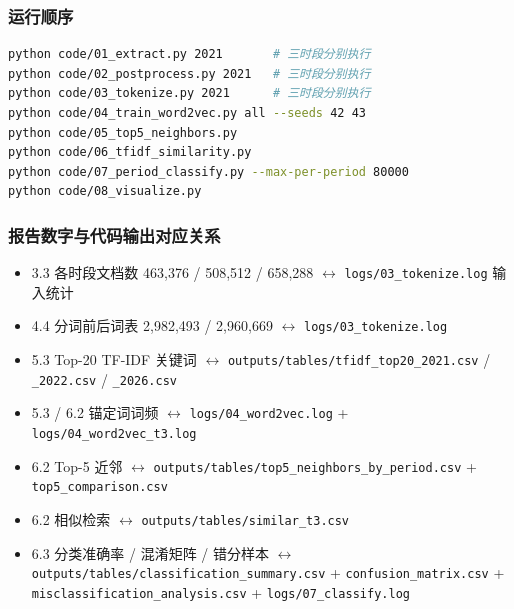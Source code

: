 \documentclass[12pt,a4paper]{article}
\begin{document}
\subsubsection*{运行顺序}

\begin{lstlisting}[language=bash, basicstyle=\ttfamily\footnotesize]
python code/01_extract.py 2021       # 三时段分别执行
python code/02_postprocess.py 2021   # 三时段分别执行
python code/03_tokenize.py 2021      # 三时段分别执行
python code/04_train_word2vec.py all --seeds 42 43
python code/05_top5_neighbors.py
python code/06_tfidf_similarity.py
python code/07_period_classify.py --max-per-period 80000
python code/08_visualize.py
\end{lstlisting}

\subsubsection*{报告数字与代码输出对应关系}

\begin{itemize}[leftmargin=2em,itemsep=0pt]
  \item 3.3 各时段文档数 463,376 / 508,512 / 658,288 $\leftrightarrow$ \texttt{logs/03\_tokenize.log} 输入统计
  \item 4.4 分词前后词表 2,982,493 / 2,960,669 $\leftrightarrow$ \texttt{logs/03\_tokenize.log}
  \item 5.3 Top-20 TF-IDF 关键词 $\leftrightarrow$ \texttt{outputs/tables/tfidf\_top20\_2021.csv} / \texttt{\_2022.csv} / \texttt{\_2026.csv}
  \item 5.3 / 6.2 锚定词词频 $\leftrightarrow$ \texttt{logs/04\_word2vec.log} + \texttt{logs/04\_word2vec\_t3.log}
  \item 6.2 Top-5 近邻 $\leftrightarrow$ \texttt{outputs/tables/top5\_neighbors\_by\_period.csv} + \texttt{top5\_comparison.csv}
  \item 6.2 相似检索 $\leftrightarrow$ \texttt{outputs/tables/similar\_t3.csv}
  \item 6.3 分类准确率 / 混淆矩阵 / 错分样本 $\leftrightarrow$ \texttt{outputs/tables/classification\_summary.csv} + \texttt{confusion\_matrix.csv} + \texttt{misclassification\_analysis.csv} + \texttt{logs/07\_classify.log}
\end{itemize}
\end{document}
